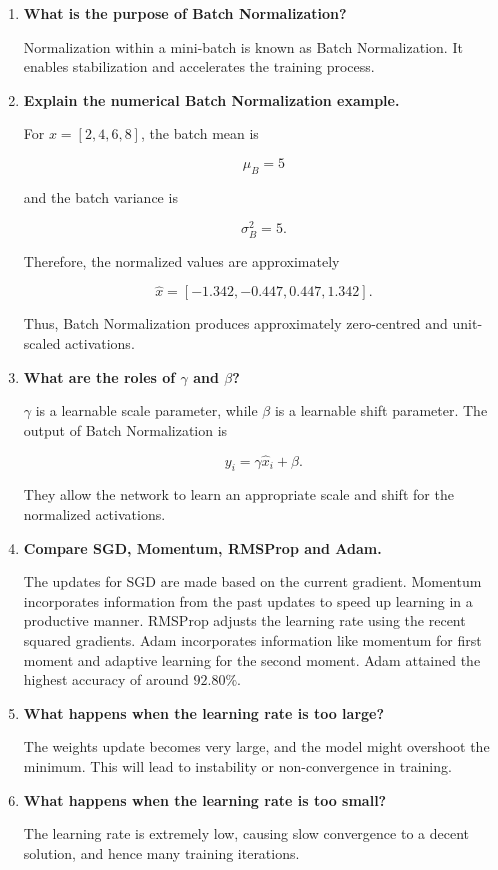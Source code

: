 \documentclass[10pt]{article}
\begin{document}
\begin{enumerate}
\item \textbf{What is the purpose of Batch Normalization?}

Normalization within a mini-batch is known as Batch Normalization. It enables stabilization and accelerates the training process.

\item \textbf{Explain the numerical Batch Normalization example.}

For $x=[2,4,6,8]$, the batch mean is

\[
\mu_B=5
\]

and the batch variance is

\[
\sigma_B^2=5.
\]

Therefore, the normalized values are approximately

\[
\hat{x}=[-1.342,-0.447,0.447,1.342].
\]

Thus, Batch Normalization produces approximately zero-centred and unit-scaled activations.

\item \textbf{What are the roles of $\gamma$ and $\beta$?}

$\gamma$ is a learnable scale parameter, while $\beta$ is a learnable shift parameter. The output of Batch Normalization is

\[
y_i=\gamma\hat{x}_i+\beta.
\]

They allow the network to learn an appropriate scale and shift for the normalized activations.

\item \textbf{Compare SGD, Momentum, RMSProp and Adam.}

The updates for SGD are made based on the current gradient. Momentum incorporates information from the past updates to speed up learning in a productive manner. RMSProp adjusts the learning rate using the recent squared gradients. Adam incorporates information like momentum for first moment and adaptive learning for the second moment. Adam attained the highest accuracy of around $92.80\%$.

\item \textbf{What happens when the learning rate is too large?}

The weights update becomes very large, and the model might overshoot the minimum. This will lead to instability or non-convergence in training.

\item \textbf{What happens when the learning rate is too small?}

The learning rate is extremely low, causing slow convergence to a decent solution, and hence many training iterations.


\end{enumerate}
\end{document}
